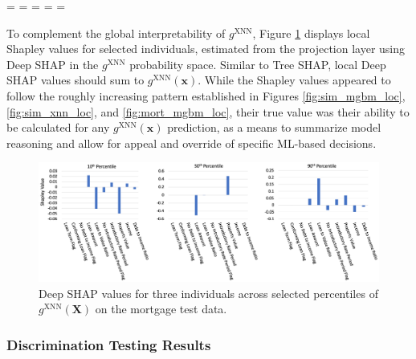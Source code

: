\documentclass[information,article,accept,moreauthors,pdftex]{Definitions/mdpi}
\begin{document}
\newpage
\restoregeometry
\paperwidth=\pdfpageheight
\paperheight=\pdfpagewidth
\pdfpageheight=\paperheight
\pdfpagewidth=\paperwidth
\headwidth=\textwidth

To complement the global interpretability of $g^\text{XNN}$, Figure \ref{fig:mort_xnn_loc} displays local Shapley values for selected individuals, estimated from the projection layer using Deep SHAP in the $g^\text{XNN}$ probability space. Similar to Tree SHAP, local Deep SHAP values should sum to $g^\text{XNN}(\mathbf{x})$. While the Shapley values appeared to follow the roughly increasing pattern established in Figures \ref{fig:sim_mgbm_loc}, \ref{fig:sim_xnn_loc}, and \ref{fig:mort_mgbm_loc}, their true value was their ability to be calculated for any $g^\text{XNN}(\mathbf{x})$ prediction, as a means to summarize model reasoning and allow for appeal and override of specific ML-based decisions. 

\begin{figure}[H]
\centering
\includegraphics[width=15cm]{img/mort_xnn_loc.png}
\caption{Deep SHAP values for three individuals across selected percentiles of $g^\text{XNN}(\mathbf{X})$ on the mortgage test data.}
\label{fig:mort_xnn_loc}
\end{figure}

\subsubsection{Discrimination Testing Results}\label{ssec:dis_mort}
\end{document}
